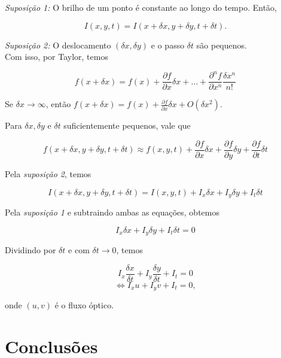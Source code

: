 \documentclass[12pt, a4paper]{article}
\begin{document}
\textit{Suposição 1:} O brilho de um ponto é constante ao longo do tempo. Então, 

\[ I(x, y, t) = I(x+ \delta x, y + \delta y, t+\delta t).\]

\textit{Suposição 2:} O deslocamento $(\delta x, \delta y)$ e o passo $\delta t$ são pequenos. \\

Com isso, por Taylor, temos

\[ f(x+\delta x) = f(x) + \frac{\partial f}{\partial x} \delta x + \dots + \frac{\partial^n f}{\partial x^n} \frac{\delta x^n}{n!}\]

Se $\delta x \to \infty$, então $f(x + \delta x) = f(x) + \frac{\partial f}{\partial x} \delta x + O(\delta x^2)$.

Para $\delta x, \delta y$ e $\delta t$ suficientemente pequenos, vale que

\[ f(x + \delta x, y + \delta y, t + \delta t) \approx f(x, y, t) + \frac{\partial f}{\partial x} \delta x + \frac{\partial f}{\partial y} \delta y + \frac{\partial f}{\partial t} \delta t \]

Pela \textit{suposição 2}, temos

\[ I(x + \delta x, y + \delta y, t + \delta t) = I(x, y, t) + I_x \delta x + I_y \delta y + I_t \delta t\]

Pela \textit{suposição 1} e subtraindo ambas as equações, obtemos

\[ I_x \delta x + I_y \delta y + I_t \delta t = 0\]

Dividindo por $\delta t$ e com $\delta t \to 0$, temos

\[ I_x \frac{\delta x}{\delta t} + I_y \frac{\delta y}{\delta t} + I_t  = 0\]
\[ \Leftrightarrow I_x u + I_y v + I_t  = 0, \]

onde $(u, v)$ é o fluxo óptico.




\section{Conclusões}




\end{document}
